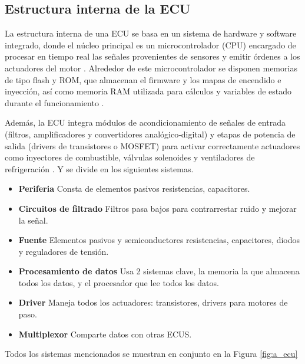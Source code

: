 \subsection{Estructura interna de la ECU} %
La estructura interna de una ECU se basa en un sistema de hardware y software integrado, donde el núcleo principal es un microcontrolador (CPU) encargado de procesar en tiempo real las señales provenientes de sensores y emitir órdenes a los actuadores del motor \citep{Bosch_EngineManagement, Heywood2018}. Alrededor de este microcontrolador se disponen memorias de tipo flash y ROM, que almacenan el firmware y los mapas de encendido e inyección, así como memoria RAM utilizada para cálculos y variables de estado durante el funcionamiento \citep{ClubAuto_ECUfuncionamiento}. 

Además, la ECU integra módulos de acondicionamiento de señales de entrada (filtros, amplificadores y convertidores analógico‑digital) y etapas de potencia de salida (drivers de transistores o MOSFET) para activar correctamente actuadores como inyectores de combustible, válvulas solenoides y ventiladores de refrigeración \citep{Autoavance_ECU2020}.
Y se divide en los siguientes sistemas.

\begin{itemize}
    \item \textbf{Periferia} Consta de elementos pasivos resistencias, capacitores. 
    \item \textbf{Circuitos de filtrado} Filtros pasa bajos para contrarrestar ruido y mejorar la señal. 
    \item \textbf{Fuente} Elementos pasivos y semiconductores resistencias, capacitores, diodos y reguladores de tensión. 
    \item \textbf{Procesamiento de datos} Usa 2 sistemas clave, la memoria la que almacena todos los datos, y el procesador que lee todos los datos. 
    \item \textbf{Driver} Maneja todos los actuadores: transistores, drivers para motores de paso. 
    \item \textbf{Multiplexor} Comparte datos con otras ECUS. 
\end{itemize}

Todos los sistemas mencionados se muestran en conjunto en la Figura \ref{fig:a_ecu}

